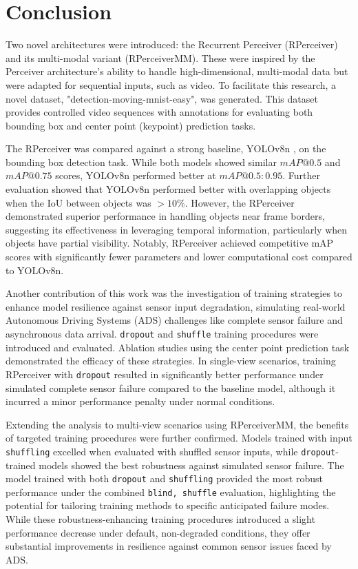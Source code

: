 \section{Conclusion} \label{Conclusion}

Two novel architectures were introduced: the Recurrent Perceiver (RPerceiver) and its multi-modal variant (RPerceiverMM). These were inspired by the Perceiver architecture's \cite{jaeglePerceiverGeneralPerception2021} ability to handle high-dimensional, multi-modal data but were adapted for sequential inputs, such as video. To facilitate this research, a novel dataset, "detection-moving-mnist-easy", was generated. This dataset provides controlled video sequences with annotations for evaluating both bounding box and center point (keypoint) prediction tasks.

The RPerceiver was compared against a strong baseline, YOLOv8n \cite{Jocher_Ultralytics_YOLO_2023}, on the bounding box detection task.
While both models showed similar $mAP@0.5$ and $mAP@0.75$ scores, YOLOv8n performed better at $mAP@0.5:0.95$. Further evaluation showed that YOLOv8n performed better with overlapping objects when the $\mathrm{IoU}$ between objects was $> 10\%$. However, the RPerceiver demonstrated superior performance in handling objects near frame borders, suggesting its effectiveness in leveraging temporal information, particularly when objects have partial visibility.
Notably, RPerceiver achieved competitive mAP scores with significantly fewer parameters and lower computational cost compared to YOLOv8n.

Another contribution of this work was the investigation of training strategies to enhance model resilience against sensor input degradation, simulating real-world Autonomous Driving Systems (ADS) challenges like complete sensor failure and asynchronous data arrival.
\texttt{dropout} and \texttt{shuffle} training procedures were introduced and evaluated.
Ablation studies using the center point prediction task demonstrated the efficacy of these strategies. In single-view scenarios, training RPerceiver with \texttt{dropout} resulted in significantly better performance under simulated complete sensor failure compared to the baseline model, although it incurred a minor performance penalty under normal conditions.

Extending the analysis to multi-view scenarios using RPerceiverMM, the benefits of targeted training procedures were further confirmed. Models trained with input \texttt{shuffling} excelled when evaluated with shuffled sensor inputs, while \texttt{dropout}-trained models showed the best robustness against simulated sensor failure.
The model trained with both \texttt{dropout} and \texttt{shuffling} provided the most robust performance under the combined \texttt{blind, shuffle} evaluation, highlighting the potential for tailoring training methods to specific anticipated failure modes.
While these robustness-enhancing training procedures introduced a slight performance decrease under default, non-degraded conditions, they offer substantial improvements in resilience against common sensor issues faced by ADS.
